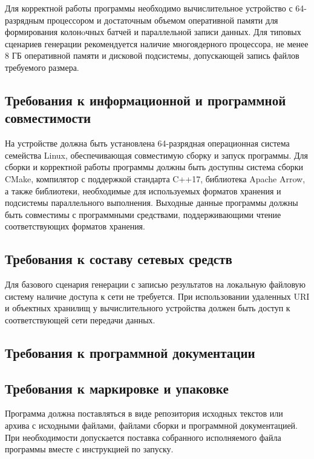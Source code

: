 \documentclass{../TechDoc}
\begin{document}
    Для корректной работы программы необходимо вычислительное устройство с 64-разрядным процессором и достаточным объемом оперативной памяти для формирования колонoчных батчей и параллельной записи данных. Для типовых сценариев генерации рекомендуется наличие многоядерного процессора, не менее 8 ГБ оперативной памяти и дисковой подсистемы, допускающей запись файлов требуемого размера.
    

    \subsection{Требования к информационной и программной совместимости}
    
    На устройстве должна быть установлена 64-разрядная операционная система семейства Linux, обеспечивающая совместимую сборку и запуск программы. Для сборки и корректной работы программы должны быть доступны система сборки CMake, компилятор с поддержкой стандарта C++17, библиотека Apache Arrow, а также библиотеки, необходимые для используемых форматов хранения и подсистемы параллельного выполнения. Выходные данные программы должны быть совместимы с программными средствами, поддерживающими чтение соответствующих форматов хранения.
    
    \subsection{Требования к составу сетевых средств}
    
    Для базового сценария генерации с записью результатов на локальную файловую систему наличие доступа к сети не требуется. При использовании удаленных URI и объектных хранилищ у вычислительного устройства должен быть доступ к соответствующей сети передачи данных.

    \subsection{Требования к программной документации}

        

    \subsection{Требования к маркировке и упаковке}
    
    Программа должна поставляться в виде репозитория исходных текстов или архива с исходными файлами, файлами сборки и программной документацией. При необходимости допускается поставка собранного исполняемого файла программы вместе с инструкцией по запуску.
\end{document}
